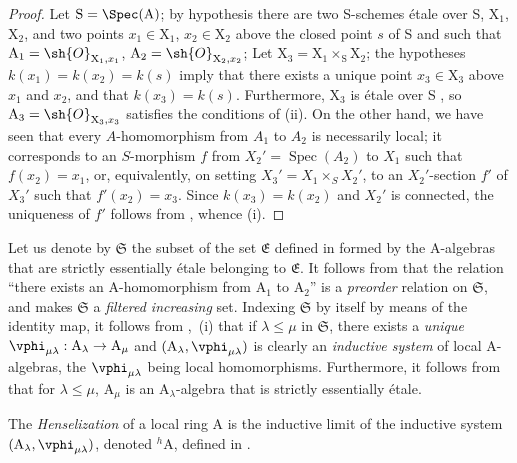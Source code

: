 \begin{proof}
Let $\mathrm{S}=\Spec(\mathrm{A})$;
by hypothesis there are two S-schemes \'{e}tale over S, $\mathrm{X}_1$, $\mathrm{X}_2$, and two points $x_1\in\mathrm{X}_1$, $x_2\in\mathrm{X}_2$ above the closed point $s$ of S and such that $\mathrm{A}_1=\sh{O}_{\mathrm{X}_1,x_1}$, $\mathrm{A}_2=\sh{O}_{\mathrm{X}_2,x_2}$;
Let $\mathrm{X}_3=\mathrm{X}_1\times_{\mathrm{S}}\mathrm{X}_2$;
the hypotheses $k(x_1)=k(x_2)=k(s)$  imply that there exists a unique point $x_3\in\mathrm{X}_3$ above $x_1$ and $x_2$, and that $k(x_3)=k(s)$.
Furthermore, $\mathrm{X}_3$ is \'{e}tale over S , so $\mathrm{A}_3=\sh{O}_{\mathrm{X}_3,x_3}$ satisfies the conditions of (ii).
On the other hand, we have seen that every $A$-homomorphism from $A_1$ to $A_2$ is necessarily local;
it corresponds to an $S$-morphism $f$ from $X_2'=\operatorname{Spec}(A_2)$ to $X_1$ such that $f(x_2)=x_1$, or, equivalently, on setting $X_3'=X_1\times_S X_2'$, to an $X_2'$-section $f'$ of $X_3'$ such that $f'(x_2)=x_3$.
Since $k(x_3)=k(x_2)$ and $X_2'$ is connected, the uniqueness of $f'$ follows from , whence (i).
\end{proof}

\begin{env}[18.6.4]
\label{IV.18.6.4}
Let us denote by $\mathfrak{S}$ the subset of the set $\mathfrak{E}$ defined in  formed by the A-algebras that are strictly essentially \'{e}tale belonging to $\mathfrak{E}$.
It follows from  that the relation ``there exists an A-homomorphism from $\mathrm{A}_1$ to $\mathrm{A}_2$'' is a \emph{preorder} relation on $\mathfrak{S}$, and makes $\mathfrak{S}$ a \emph{filtered increasing} set.
Indexing $\mathfrak{S}$ by itself by means of the identity map, it follows from ,~(i) that if $\lambda\leq\mu$ in $\mathfrak{S}$, there exists a \emph{unique} $\vphi_{\mu\lambda}:\mathrm{A}_\lambda\to\mathrm{A}_\mu$ and $(\mathrm{A}_\lambda,\vphi_{\mu\lambda})$ is clearly an \emph{inductive system} of local A-algebras, the $\vphi_{\mu\lambda}$ being local homomorphisms.
Furthermore, it follows from  that for $\lambda\leq\mu$, $\mathrm{A}_\mu$ is an $\mathrm{A}_\lambda$-algebra that is strictly essentially \'{e}tale.
\end{env}

\begin{definition}[18.6.5]
\label{IV.18.6.5}
The \emph{Henselization} of a local ring $\mathrm{A}$ is the inductive limit of the inductive system $(\mathrm{A}_\lambda,\vphi_{\mu\lambda})$, denoted ${}^h\!\mathrm{A}$, defined in .
\end{definition}

